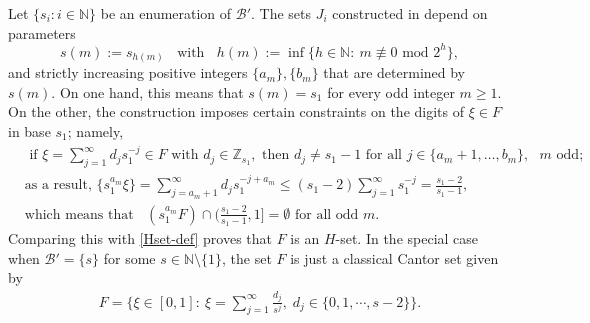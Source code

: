 \documentclass[12pt, twoside]{article}
\theoremstyle{definition}
\numberwithin{equation}{section}
\begin{document}
\vskip0.1in
\noindent Let $\{s_i: i \in \mathbb N\}$ be an enumeration of $\mathscr{B}'$. The sets $J_i$  constructed in \cite{p81} depend on parameters 
\[ s(m):=s_{h(m)} \; \; \text{ with } \; \; h(m):=\inf\{h\in\mathbb{N}:\ m \not\equiv 0 \text{ mod } {2^h} \}, \] 
and strictly increasing positive integers $\{a_m\},\{b_m\}$ that are determined by $s(m)$. On one hand, this means that 
$s(m)=s_1$ for every odd integer $m \geq 1$. On the other, the construction imposes certain constraints on the digits of $\xi \in F$ in base $s_1$; namely,  
\begin{align*} &\text{ if } \xi=\sum_{j=1}^\infty {d_j}s_1^{-j} \in F \text{ with } d_j \in \mathbb Z_{s_1}, \text{ then } d_j \neq s_1-1 
 \text{ for all } j \in \{a_{m}+1, \ldots, b_{m} \}, \text{ $m$ odd; } \\
 &\text{as a result, }  \bigl\{s_1^{a_m}\xi \bigr\} =  \sum_{j=a_{m}+1}^\infty {d_j}{s_1^{-j+a_{m}}} \leq  (s_1-2) \sum_{j=1}^{\infty} s_1^{-j} =  \frac{s_1-2}{s_1-1}, \\ 
&\text{which means that } \; \; (s_1^{a_m} F)\cap \bigl(\frac{s_1-2}{s_1-1}, 1\bigr] =\emptyset \text{ for all odd $m$}. \end{align*} 
Comparing this with \eqref{Hset-def} proves that $F$ is an $H$-set. In the special case when $\mathscr{B}'=\{s\}$ for some $s \in \mathbb N \setminus \{1\}$, the set $F$ is just a classical Cantor set given by 
\begin{align*}
	F =\Big\{\xi\in[0,1]:\ \xi=\sum_{j=1}^\infty\frac{d_j}{s^j},\; d_j\in\{0,1,\cdots,s-2\}\Big\}.
\end{align*}

\newpage
\end{document}
